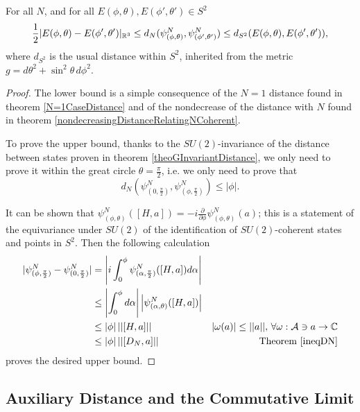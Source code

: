 \begin{theorem}\label{geometricDistanceCommutativeUpperBound}
For all $N$, and for all $E(\phi, \theta), E(\phi', \theta') \in S^2$
\begin{equation}
    \frac{1}{2}|E(\phi, \theta)- E(\phi', \theta')|_{\RR^3}  \leq d_N(\psi^N_{(\phi, \theta)}, \psi^N_{(\phi', \theta')}) \leq d_{S^2}(E(\phi, \theta), E(\phi', \theta')),
\end{equation}
where $d_{S^2}$ is the usual distance within $S^2$, inherited from the metric $g = d\theta^2 + \sin^2 \theta \, d\phi^2$.
\end{theorem}
\begin{proof}
The lower bound is a simple consequence of the $N = 1$ distance found in theorem \ref{N=1CaseDistance} and of the nondecrease of the distance with $N$ found in theorem \ref{nondecreasingDistanceRelatingNCoherent}.

To prove the upper bound, thanks to the $SU(2)$-invariance of the distance between states proven in theorem \ref{theoGInvariantDistance}, we only need to prove it within the great circle $\theta = \frac{\pi}{2}$, i.e. we only need to prove that 
\begin{equation*}
    d_N(\psi^N_{(0, \frac{\pi}{2})}, \psi^N_{(\phi, \frac{\pi}{2})}) \leq |\phi|.
\end{equation*}

It can be shown that $\psi^N_{(\phi, \theta)}([H, a]) = -i \frac{\partial}{\partial \phi} \psi^N_{(\phi, \theta)}(a)$; this is a statement of the equivariance under $SU(2)$ of the identification of $SU(2)$-coherent states and points in $S^2$. Then the following calculation
\begin{align*}
    |\psi^N_{(\phi, \frac{\pi}{2})} - \psi^N_{(0, \frac{\pi}{2})}| 
        &= \left|i \int_0^\phi \psi^N_{(\alpha, \frac{\pi}{2})}([H, a]) d\alpha \right|  \\
        &\leq \left| \int_0^\phi d\alpha \right| \left| \psi^N_{(\alpha, \theta)}([H, a]) \right|\\
        &\leq |\phi|\,||[H, a]|| 
        & |\omega(a)| \leq ||a||,\,\forall\omega: \acal \ni a \to \CC\\
        &\leq |\phi|\, ||[D_N, a]||    & \text{Theorem \ref{ineqDN}}
\end{align*}
proves the desired upper bound.
\end{proof}
\subsection{Auxiliary Distance and the Commutative Limit}
\label{ChFSSectionLimit}

